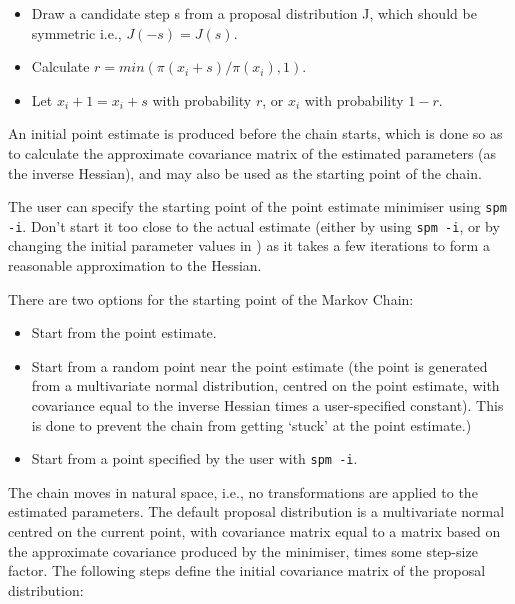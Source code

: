 \begin{itemize}
\item Draw a candidate step s from a proposal distribution J, which should be symmetric i.e., $J(-s)=J(s)$.

\item Calculate $r=min(\pi(x_i+s)/\pi(x_i),1)$. 

\item Let $x_i+1=x_i+s$ with probability $r$, or $x_i$ with probability $1-r$.
\end{itemize}

An initial point estimate is produced before the chain starts, which is done so as to calculate the approximate covariance matrix of the estimated parameters (as the inverse Hessian), and may also be used as the starting point of the chain. 

The user can specify the starting point of the point estimate minimiser using \texttt{spm -i}. Don't start it too close to the actual estimate (either by using \texttt{spm -i}, or by changing the initial parameter values in \config) as it takes a few iterations to form a reasonable approximation to the Hessian. 

There are two options for the starting point of the Markov Chain: 

\begin{itemize}
\item Start from the point estimate.

\item Start from a random point near the point estimate (the point is generated from a multivariate normal distribution, centred on the point estimate, with covariance equal to the inverse Hessian times a user-specified constant). This is done to prevent the chain from getting `stuck' at the point estimate.)

\item Start from a point specified by the user with \texttt{spm -i}.
\end{itemize}

The chain moves in natural space, i.e., no transformations are applied to the estimated parameters. The default proposal distribution is a multivariate normal centred on the current point, with covariance matrix equal to a matrix based on the approximate covariance produced by the minimiser, times some step-size factor. The following steps define the initial covariance matrix of the proposal distribution: 

